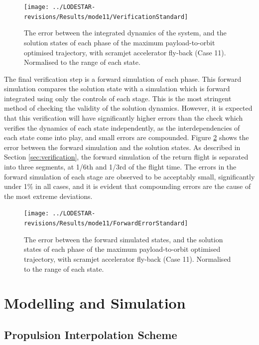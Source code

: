 \begin{figure}[ht]
	\centering
	\texttt{[image: ../LODESTAR-revisions/Results/mode11/VerificationStandard]}
	\caption{The error between the integrated dynamics of the system, and the solution states of each phase of the maximum payload-to-orbit optimised trajectory, with scramjet accelerator fly-back (Case 11). Normalised to the range of each state.}
	\label{fig:VerificationStandard}
\end{figure}

The final verification step is a forward simulation of each phase. This forward simulation compares the solution state with a simulation which is forward integrated using only the controls of each stage. This is the most stringent method of checking the validity of the solution dynamics. However, it is expected that this verification will have significantly higher errors than the check which verifies the dynamics of each state independently, as the interdependencies of each state come into play, and small errors are compounded. Figure \ref{fig:ForwardErrorStandard} shows the error between the forward simulation and the solution states. As described in Section \ref{sec:verification}, the forward simulation of the return flight is separated into three segments, at 1/6th and 1/3rd of the flight time. The errors in the forward simulation of each stage are observed to be acceptably small, significantly under 1\% in all cases, and it is evident that compounding errors are the cause of the most extreme deviations. 

\begin{figure}[ht]
	\centering
	\texttt{[image: ../LODESTAR-revisions/Results/mode11/ForwardErrorStandard]}
	\caption{The error between the forward simulated states, and the solution states of each phase of the maximum payload-to-orbit optimised trajectory, with scramjet accelerator fly-back (Case 11). Normalised to the range of each state.}
	\label{fig:ForwardErrorStandard}
\end{figure}



\chapter{Modelling and Simulation}\label{Appendix:sim}
\section{Propulsion Interpolation Scheme}

